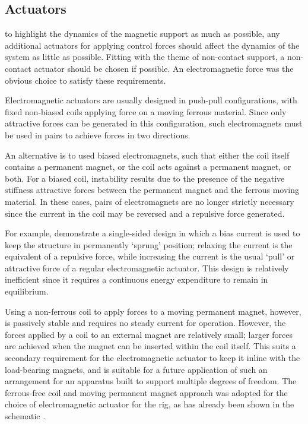 \subsection{Actuators}

to highlight the dynamics of the magnetic support as much as possible, any
additional actuators for applying control forces should affect the dynamics of
the system as little as possible. Fitting with the theme of non-contact
support, a non-contact actuator should be chosen if possible. An
electromagnetic force was the obvious choice to satisfy these requirements.

Electromagnetic actuators are usually designed in push-pull configurations,
with fixed non-biased coils applying force on a moving ferrous material. Since
only attractive forces can be generated in this configuration, such
electromagnets must be used in pairs to achieve forces in two directions.

An alternative is to used biased electromagnets, such that either the coil
itself contains a permanent magnet, or the coil acts against a permanent
magnet, or both. For a biased coil, instability results due to the presence of
the negative stiffness attractive forces between the permanent magnet and the
ferrous moving material. In these cases, pairs of electromagnets are no longer
strictly necessary since the current in the coil may be reversed and a
repulsive force generated.

For example, \textcite{nandi2009} demonstrate a single-sided design in which a
bias current is used to keep the structure in permanently `sprung' position;
relaxing the current is the equivalent of a repulsive force, while increasing
the current is the usual `pull' or attractive force of a regular
electromagnetic actuator. This design is relatively inefficient since it
requires a continuous energy expenditure to remain in equilibrium.

Using a non-ferrous coil to apply forces to a moving permanent magnet,
however, is passively stable and requires no steady current for operation.
However, the forces applied by a coil to an external magnet are relatively
small; larger forces are achieved when the magnet can be inserted within the
coil itself. This suits a secondary requirement for the electromagnetic
actuator to keep it inline with the load-bearing magnets, and is suitable for a
future application of such an arrangement for an apparatus built to support
multiple degrees of freedom. The ferrous-free coil and moving permanent magnet
approach was adopted for the choice of electromagnetic actuator for the rig,
as has already been shown in the schematic .


